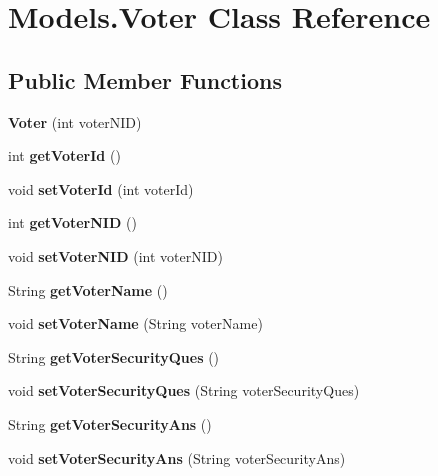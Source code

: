 \hypertarget{class_models_1_1_voter}{}\section{Models.\+Voter Class Reference}
\label{class_models_1_1_voter}
\subsection*{Public Member Functions}
\begin{DoxyCompactItemize}
\item 
\mbox{\label{class_models_1_1_voter_a86112555a97a4be0784c2e67bc7a54db}} 
{\bfseries Voter} (int voter\+N\+ID)
\item 
\mbox{\label{class_models_1_1_voter_a7499ad46caa94cf33cbba4ada717aa4a}} 
int {\bfseries get\+Voter\+Id} ()
\item 
\mbox{\label{class_models_1_1_voter_a178017b4ecfd360ec40b7e9272375999}} 
void {\bfseries set\+Voter\+Id} (int voter\+Id)
\item 
\mbox{\label{class_models_1_1_voter_afdf499dc957e8e26c7f4c4e0e263f557}} 
int {\bfseries get\+Voter\+N\+ID} ()
\item 
\mbox{\label{class_models_1_1_voter_a7e09cfdd897b8b5e896ceb41c01cef7f}} 
void {\bfseries set\+Voter\+N\+ID} (int voter\+N\+ID)
\item 
\mbox{\label{class_models_1_1_voter_a4cf0c0dbd3c797f46e659d66e3bf3ef6}} 
String {\bfseries get\+Voter\+Name} ()
\item 
\mbox{\label{class_models_1_1_voter_a8b077d4e5fffae1fd7cd49ccab22d442}} 
void {\bfseries set\+Voter\+Name} (String voter\+Name)
\item 
\mbox{\label{class_models_1_1_voter_a6b5b9a7406211c9ed4e858e4d62a9842}} 
String {\bfseries get\+Voter\+Security\+Ques} ()
\item 
\mbox{\label{class_models_1_1_voter_abf75dbe8c580b23282bf310c7a9c14bc}} 
void {\bfseries set\+Voter\+Security\+Ques} (String voter\+Security\+Ques)
\item 
\mbox{\label{class_models_1_1_voter_a0d7a68ead092ad37b325ad5ccd8961c7}} 
String {\bfseries get\+Voter\+Security\+Ans} ()
\item 
\mbox{\label{class_models_1_1_voter_ac0f139fe76890e4afadb631776be22ee}} 
void {\bfseries set\+Voter\+Security\+Ans} (String voter\+Security\+Ans)
\end{DoxyCompactItemize}

